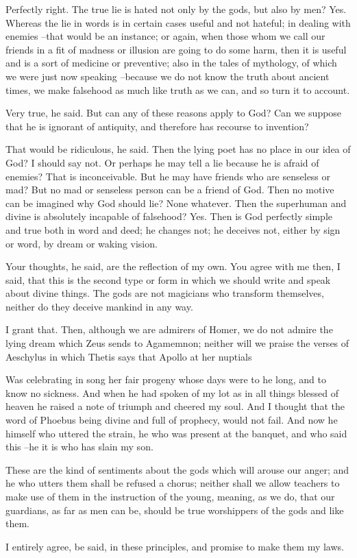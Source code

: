 Perfectly right.
The true lie is hated not only by the gods, but also by men?
Yes.
Whereas the lie in words is in certain cases useful and not hateful; in dealing with enemies --that would be an instance; or again, when those whom we call our friends in a fit of madness or illusion are going to do some harm, then it is useful and is a sort of medicine or preventive; also in the tales of mythology, of which we were just now speaking --because we do not know the truth about ancient times, we make falsehood as much like truth as we can, and so turn it to account.

Very true, he said.
But can any of these reasons apply to God? Can we suppose that he is ignorant of antiquity, and therefore has recourse to invention?

That would be ridiculous, he said.
Then the lying poet has no place in our idea of God?
I should say not.
Or perhaps he may tell a lie because he is afraid of enemies?
That is inconceivable.
But he may have friends who are senseless or mad?
But no mad or senseless person can be a friend of God.
Then no motive can be imagined why God should lie?
None whatever.
Then the superhuman and divine is absolutely incapable of falsehood?
Yes.
Then is God perfectly simple and true both in word and deed; he changes not; he deceives not, either by sign or word, by dream or waking vision.

Your thoughts, he said, are the reflection of my own.
You agree with me then, I said, that this is the second type or form in which we should write and speak about divine things. The gods are not magicians who transform themselves, neither do they deceive mankind in any way.

I grant that.
Then, although we are admirers of Homer, we do not admire the lying dream which Zeus sends to Agamemnon; neither will we praise the verses of Aeschylus in which Thetis says that Apollo at her nuptials

Was celebrating in song her fair progeny whose days were to he long, and to know no sickness. And when he had spoken of my lot as in all things blessed of heaven he raised a note of triumph and cheered my soul. And I thought that the word of Phoebus being divine and full of prophecy, would not fail. And now he himself who uttered the strain, he who was present at the banquet, and who said this --he it is who has slain my son.

These are the kind of sentiments about the gods which will arouse our anger; and he who utters them shall be refused a chorus; neither shall we allow teachers to make use of them in the instruction of the young, meaning, as we do, that our guardians, as far as men can be, should be true worshippers of the gods and like them.

I entirely agree, be said, in these principles, and promise to make them my laws.